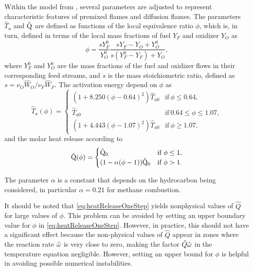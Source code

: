 Within the model from \textcite{fernandez-tarrazoSimpleOnestepChemistry2006}, several parameters are adjusted to represent characteristic features of premixed flames and diffusion flames. The parameters $\hat T_a$ and $\hat {\mathrm{Q}}$ are defined as functions of the local equivalence ratio $\phi$, which is, in turn, defined in terms of the local mass fractions of fuel $Y_F$ and oxidizer $Y_O$ as
\begin{equation}\label{eq:equivalenceRatio}
	\phi = \frac{s Y_F^0}{Y_O^0}\frac{s Y_F-Y_O+Y_O^0}{s(Y_F^0-Y_F) + Y_O},
\end{equation}
where $Y_F^0$ and $Y_O^0$ are the mass fractions of the fuel and oxidizer flows in their corresponding feed streams, and $s$ is the mass stoichiometric ratio, defined as $s =\nu_O \hat W_O/\nu_F \hat W_F$.
The activation energy depend on $\phi$ as
\begin{equation}
	\hat{T}_a(\phi)=
	\begin{cases}
		(1 + 8.250(\phi-0.64)^2) \hat{T}_{a0} & \text{if}~ 	\phi \leq 0.64,           \\
		\hat{T}_{a0}                          & \text{if}~ 	0.64 \leq \phi \leq 1.07, \\
		(1 + 4.443(\phi-1.07)^2)\hat{T}_{a0}  & \text{if}~\phi \geq 1.07,
	\end{cases} \label{eq:ActivationTemperatureOneStep}
\end{equation}
and the molar heat release according to
\begin{equation}
	\hat{\mathrm{Q}}(\phi)=
	\begin{cases}
		\hat{\mathrm{Q}}_0                      & \text{if}~ \phi \leq 1, \\
		(1 - \alpha(\phi -1))\hat{\mathrm{Q}}_0 & \text{if}~\phi > 1.
	\end{cases}  \label{eq:heatReleaseOneStep}
\end{equation}

The parameter $\alpha$ is a constant that depends on the hydrocarbon being considered, in particular $\alpha = 0.21$ for methane combustion.

It should be noted that \cref{eq:heatReleaseOneStep} yields nonphysical values of $\hat Q$ for large values of $\phi$. This problem can be avoided by setting an upper boundary value for $\phi$ in \cref{eq:heatReleaseOneStep}. However, in practice, this should not have a significant effect because the non-physical values of $\hat Q$ appear in zones where the reaction rate $\hat{\omega}$ is very close to zero, making the factor $\hat Q \hat{\omega}$ in the temperature equation negligible. However, setting an upper bound for $\phi$ is helpful in avoiding possible numerical instabilities.

